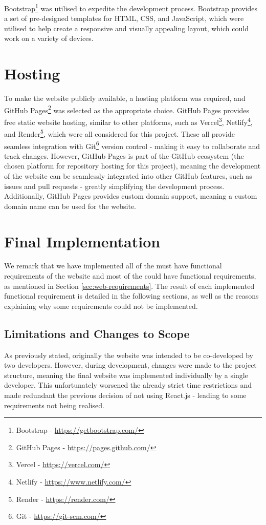 \documentclass{l4proj}
\begin{document}
Bootstrap\footnote{Bootstrap - \url{https://getbootstrap.com/}} was utilised to expedite the development process. Bootstrap provides a set of pre-designed templates for HTML, CSS, and JavaScript, which were utilised to help create a responsive and visually appealing layout, which could work on a variety of devices.


\section{Hosting}\label{sec:competition-hosting}
To make the website publicly available, a hosting platform was required, and GitHub Pages\footnote{GitHub Pages - \url{https://pages.github.com/}} was selected as the appropriate choice. GitHub Pages provides free static website hosting, similar to other platforms, such as Vercel\footnote{Vercel - \url{https://vercel.com/}}, Netlify\footnote{Netlify - \url{https://www.netlify.com/}}, and Render\footnote{Render - \url{https://render.com/}}, which were all considered for this project. These all provide seamless integration with Git\footnote{Git - \url{https://git-scm.com/}} version control - making it easy to collaborate and track changes. However, GitHub Pages is part of the GitHub ecosystem (the chosen platform for repository hosting for this project), meaning the development of the website can be seamlessly integrated into other GitHub features, such as issues and pull requests - greatly simplifying the development process. Additionally, GitHub Pages provides custom domain support, meaning a custom domain name can be used for the website.


\section{Final Implementation}
We remark that we have implemented all of the must have functional requirements of the website and most of the could have functional requirements, as mentioned in Section \ref{sec:web-requirements}. The result of each implemented functional requirement is detailed in the following sections, as well as the reasons explaining why some requirements could not be implemented.

\subsection{Limitations and Changes to Scope}
As previously stated, originally the website was intended to be co-developed by two developers. However, during development, changes were made to the project structure, meaning the final website was implemented individually by a single developer. This unfortunately worsened the already strict time restrictions and made redundant the previous decision of not using React.js - leading to some requirements not being realised.
\end{document}
